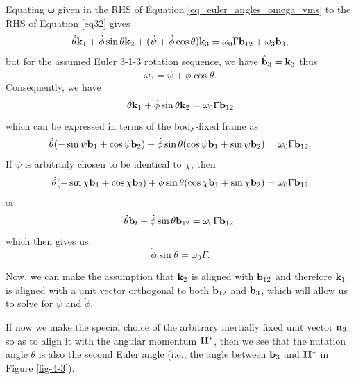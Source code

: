 Equating $\boldsymbol\omega$ given in the RHS of Equation \eqref{eq_euler_angles_omega_vms} to the RHS of Equation \eqref{eq32} gives
\begin{equation}
\label{eq_euler_angles_omega_vms_3}
\dot{\theta} {\bf k}_1 + \dot{\phi} \sin \theta {\bf k}_{2} + (\dot{\psi} + \dot{\phi} \cos \theta) {\bf k}_3 = \omega_0 \Gamma{\bf b}_{12} + \omega_3 {\bf b}_3,
\end{equation}
but for the assumed Euler 3-1-3 rotation sequence, we have $\hat{\bf b}_3 = {\bf k}_3$ thus
\begin{equation}
\omega_3 = \dot\psi + \dot{\phi} \cos \theta.
\end{equation}
Consequently, we have
\begin{equation}
\dot{\theta} {\bf k}_1 + \dot{\phi} \sin \theta {\bf k}_{2} = \omega_0 \Gamma{\bf b}_{12} 
\end{equation}
which can be expressed in terms of the body-fixed frame as
\begin{equation}
\dot{\theta} (-\sin\psi {\bf b}_1 + \cos\psi {\bf b}_2)  + \dot{\phi} \sin \theta (\cos\psi {\bf b}_1 + \sin\psi {\bf b}_2) = \omega_0 \Gamma {\bf b}_{12}.
\end{equation}
If $\psi$ is arbitraily chosen to be identical to $\chi$, then 
\begin{equation}
\dot{\theta} (-\sin\chi {\bf b}_1 + \cos\chi {\bf b}_2)  + \dot{\phi} \sin \theta (\cos\chi {\bf b}_1 + \sin\chi {\bf b}_2) = \omega_0 \Gamma {\bf b}_{12}
\end{equation}
or
\begin{equation}
\dot{\theta} {\bf b}_t  + \dot{\phi} \sin \theta {\bf b}_{12} = \omega_0 \Gamma {\bf b}_{12}.
\end{equation}
which then gives us:
\begin{equation}
\dot{\phi} \sin \theta = \omega_0 \Gamma.
\end{equation}

Now, we can make the assumption that ${\bf k}_2$ is aligned with ${\bf b}_{12}$ and
therefore ${\bf k}_1$ is aligned with a unit vector orthogonal to both ${\bf b}_{12}$ and ${\bf b}_3$, which will allow us to solve for $\dot{\psi}$ and $\dot{\phi}$.

If now we make the special choice of the arbitrary inertially fixed unit 
vector ${\bf n}_{3}$ so as to align it with the angular momentum
${\bf H}^*$, then we see that the nutation angle $\theta$ is also the
second Euler angle (i.e., the angle between ${\bf b}_{3}$ and
${\bf H}^*$ in Figure \ref{fig-4-3}).

